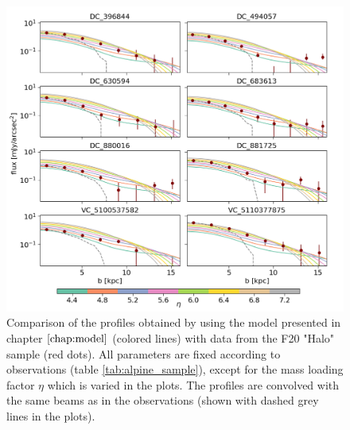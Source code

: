 \begin{figure}[t]
    \centering
    \includegraphics[width=1.0\textwidth]{plots/single_profile_emission.png}
    \caption{Comparison of the \CII profiles obtained by using the model presented in chapter $\ref{chap:model}$ (colored lines) with data from the F20 "\CII Halo" sample (red dots). All parameters are fixed according to observations (table \ref{tab:alpine_sample}), except for the mass loading factor $\eta$ which is varied in the plots. The profiles are convolved with the same beams as in the observations (shown with dashed grey lines in the plots).
    \label{fig:single_profiles}
    }
\end{figure}


